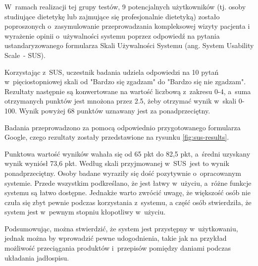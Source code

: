 \par
W~ramach realizacji tej grupy testów, 9 potencjalnych użytkowników (tj. osoby studiujące dietetykę lub zajmujące się profesjonalnie dietetyką)
zostało poproszonych o~zasymulowanie przeprowadzania kompleksowej wizyty pacjenta
i wyrażenie opinii o~używalności systemu poprzez odpowiedź na pytania ustandaryzowanego formularza Skali Używalności Systemu (ang. System Usability Scale~- SUS)\cite{url:sus}.

\par
Korzystając z~SUS, uczestnik badania udziela odpowiedzi na 10 pytań w~pięciostopniowej skali od "Bardzo się zgadzam" do "Bardzo się nie zgadzam".
Rezultaty następnie są konwertowane na wartość liczbową z~zakresu 0-4, a~suma otrzymanych punktów jest mnożona przez 2.5, żeby otrzymać wynik w~skali 0-100.
Wynik powyżej 68 punktów uznawany jest za ponadprzeciętny.
\par
Badania przeprowadzono za pomocą odpowiednio przygotowanego formularza Google\cite{tech:google-forms}, czego rezultaty zostały przedstawione na rysunku \ref{fig:sus-results}.
%
%


Punktowa wartość wyników wahała się od 65 pkt do 82,5 pkt, a~średni uzyskany wynik wyniósł 73,6 pkt.
Według skali przyjmowanej w~SUS~jest to wynik ponadprzeciętny.
Osoby badane wyraziły się dość pozytywnie o~opracowanym systemie.
Przede wszystkim podkreślano, że jest łatwy w~użyciu, a~różne funkcje systemu są łatwo dostępne.
Jednakże warto zwrócić uwagę, że większość osób nie czuła się zbyt pewnie podczas korzystania z~systemu,
a część osób stwierdziła, że system jest w~pewnym stopniu kłopotliwy w~użyciu.

\par
Podsumowując, można stwierdzić, że system jest przystępny w~użytkowaniu, jednak można by wprowadzić pewne udogodnienia,
takie jak na przykład możliwość przeciągania produktów i~przepisów pomiędzy daniami podczas układania jadłospisu.

\thispagestyle{normal}
